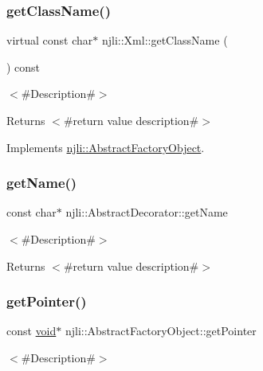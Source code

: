 \subsubsection{\texorpdfstring{get\+Class\+Name()}{getClassName()}}
{\footnotesize\ttfamily virtual const char$\ast$ njli\+::\+Xml\+::get\+Class\+Name (\begin{DoxyParamCaption}{ }\end{DoxyParamCaption}) const\hspace{0.3cm}{\ttfamily [virtual]}}

$<$\#\+Description\#$>$

\begin{DoxyReturn}{Returns}
$<$\#return value description\#$>$ 
\end{DoxyReturn}


Implements \mbox{\hyperlink{classnjli_1_1_abstract_factory_object_af4151e41b80d5bc3fc42822c67fc2278}{njli\+::\+Abstract\+Factory\+Object}}.

\mbox{\label{classnjli_1_1_xml_ad41266885be835f3ee602311e20877a4}} 
\subsubsection{\texorpdfstring{get\+Name()}{getName()}}
{\footnotesize\ttfamily const char$\ast$ njli\+::\+Abstract\+Decorator\+::get\+Name}

$<$\#\+Description\#$>$

\begin{DoxyReturn}{Returns}
$<$\#return value description\#$>$ 
\end{DoxyReturn}
\mbox{\label{classnjli_1_1_xml_ac4ca71716ed832be357f15f8262c8448}} 
\subsubsection{\texorpdfstring{get\+Pointer()}{getPointer()}}
{\footnotesize\ttfamily const \mbox{\hyperlink{_thread_8h_af1e856da2e658414cb2456cb6f7ebc66}{void}}$\ast$ njli\+::\+Abstract\+Factory\+Object\+::get\+Pointer}

$<$\#\+Description\#$>$ \mbox{\label{classnjli_1_1_xml_a4ffddf141a426a5a07d0ac19f1913811}} 
